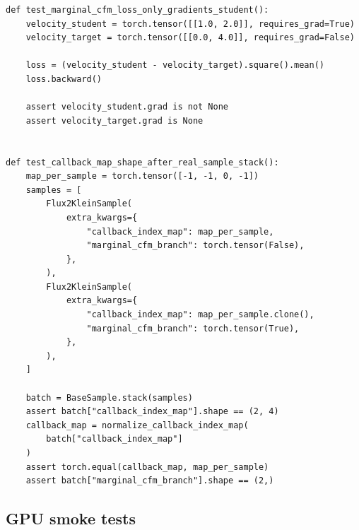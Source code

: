 \documentclass[11pt,a4paper]{article}
\theoremstyle{plain}
\theoremstyle{definition}
\begin{document}
\begin{lstlisting}[style=python,caption={Representative implemented helper-level assertions.}]
def test_marginal_cfm_loss_only_gradients_student():
    velocity_student = torch.tensor([[1.0, 2.0]], requires_grad=True)
    velocity_target = torch.tensor([[0.0, 4.0]], requires_grad=False)

    loss = (velocity_student - velocity_target).square().mean()
    loss.backward()

    assert velocity_student.grad is not None
    assert velocity_target.grad is None


def test_callback_map_shape_after_real_sample_stack():
    map_per_sample = torch.tensor([-1, -1, 0, -1])
    samples = [
        Flux2KleinSample(
            extra_kwargs={
                "callback_index_map": map_per_sample,
                "marginal_cfm_branch": torch.tensor(False),
            },
        ),
        Flux2KleinSample(
            extra_kwargs={
                "callback_index_map": map_per_sample.clone(),
                "marginal_cfm_branch": torch.tensor(True),
            },
        ),
    ]

    batch = BaseSample.stack(samples)
    assert batch["callback_index_map"].shape == (2, 4)
    callback_map = normalize_callback_index_map(
        batch["callback_index_map"]
    )
    assert torch.equal(callback_map, map_per_sample)
    assert batch["marginal_cfm_branch"].shape == (2,)
\end{lstlisting}

\subsection{GPU smoke tests}
\end{document}
